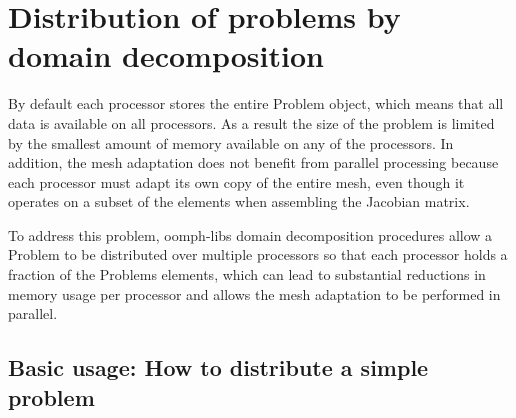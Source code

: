  

\hypertarget{index_domain_decomposition}{}\section{Distribution of problems by domain decomposition}\label{index_domain_decomposition}
By default each processor stores the entire {\ttfamily Problem} object, which means that all data is available on all processors. As a result the size of the problem is limited by the smallest amount of memory available on any of the processors. In addition, the mesh adaptation does not benefit from parallel processing because each processor must adapt its own copy of the entire mesh, even though it operates on a subset of the elements when assembling the Jacobian matrix.

To address this problem, {\ttfamily oomph-\/lib\textquotesingle{}s} domain decomposition procedures allow a {\ttfamily Problem} to be distributed over multiple processors so that each processor holds a fraction of the {\ttfamily Problem\textquotesingle{}s} elements, which can lead to substantial reductions in memory usage per processor and allows the mesh adaptation to be performed in parallel.



\hypertarget{index_how_to_distribute}{}\subsection{Basic usage\+: How to distribute a simple problem}\label{index_how_to_distribute}

